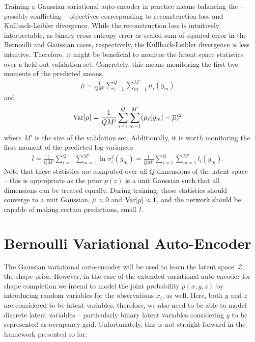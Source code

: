 Training a Gaussian variational auto-encoder in practice means
balancing the -- possibly conflicting -- objectives corresponding to
reconstruction loss and Kullback-Leibler divergence.
While the reconstruction loss is intuitively interpretable, \eg as binary cross
entropy error or scaled sum-of-squared error in the Bernoulli and Gaussian
cases, respectively, the Kullback-Leibler divergence is less intuitive.
Therefore, it might be beneficial to monitor
the latent space statistics over a held-out validation set. Concretely, this means
monitoring the first two moments of the predicted means, \ie
\begin{align}
  \overline{\mu} = \frac{1}{QM'} \sum_{i = 1}^Q\sum_{m = 1}^{M'} \mu_i(y_m)
  \label{eq:shape-prior-monitor-mean-mean}
\end{align}
and
\begin{align}
  \mathrm{Var}[\mu] = \frac{1}{QM'}\sum_{i = 1}^Q\sum_{m = 1}^{M'} (\mu_i(y_m) - \overline{\mu})^2
  \label{eq:shape-prior-monitor-variance-mean}
\end{align}
where $M'$ is the size of the validation set. Additionally, it is worth
monitoring the first moment of the predicted log-variances
\begin{align}
  \overline{l} = \frac{1}{QM'} \sum_{i = 1}^Q\sum_{m = 1}^{M'} \ln \sigma_i^2(y_m) = \frac{1}{QM'} \sum_{i = 1}^Q\sum_{m = 1}^{M'} l_i(y_m).
  \label{eq:shape-prior-monitor-mean-variance}
\end{align}
Note that these statistics are computed over all $Q$ dimensions of the latent
space -- this is appropriate as the prior $p(z)$ is a unit Gaussian such that
all dimensions can be treated equally.
During training, these statistics should converge to a unit Gaussian,
\ie $\overline{\mu} \approx 0$ and $\mathrm{Var}[\mu] \approx 1$, and the network
should be capable of making certain predictions, \ie small $\overline{l}$.

\section{Bernoulli Variational Auto-Encoder}
\label{sec:shape-prior-bernoulli-vae}

The Gaussian variational auto-encoder will be used to learn the latent space~$\mathcal{Z}$,
\ie the shape prior. However, in the case of the extended variational
auto-encoder for shape completion we intend to model the joint
probability $p(x, y, z)$ by introducing random variables for the observations
$x_i$, as well. Here, both $y$ and $z$ are considered to be latent variables,
therefore, we also need to be able to model discrete latent variables -- particularly
binary latent variables considering $y$ to be represented as occupancy grid.
Unfortunately, this is not straight-forward in the framework presented so far.


